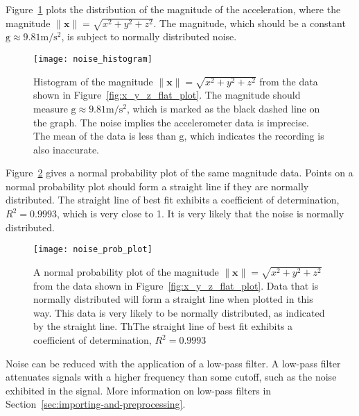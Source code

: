       
      Figure~\ref{fig:noise_histogram} plots the distribution of the magnitude of the acceleration, where the magnitude $\|\mathbf{x}\| = \sqrt{x^2+y^2+z^2}$. The magnitude, which should be a constant $\mathrm{g} \approx 9.81 \si{\meter\per\square\second}$, is subject to normally distributed noise.
      
      \begin{figure}
        \centering
        \texttt{[image: noise\_histogram]}
        \caption{Histogram of the magnitude $\|\mathbf{x}\| = \sqrt{x^2+y^2+z^2}$ from the data shown in Figure~\ref{fig:x_y_z_flat_plot}. The magnitude should measure $ \mathrm{g} \approx 9.81\si{\metre\per\square\second}$, which is marked as the black dashed line on the graph. The noise implies the accelerometer data is imprecise. The mean of the data is less than $\mathrm{g}$, which indicates the recording is also inaccurate.}
        \label{fig:noise_histogram}
      \end{figure}
      
      Figure~\ref{fig:noise_prob_plot} gives a normal probability plot of the same magnitude data. Points on a normal probability plot should form a straight line if they are normally distributed. The straight line of best fit exhibits a coefficient of determination, $R^2 = 0.9993$, which is very close to 1. It is very likely that the noise is normally distributed.
      
      \begin{figure}
        \centering
        \texttt{[image: noise\_prob\_plot]}
        \caption{A normal probability plot of the magnitude $\|\mathbf{x}\| = \sqrt{x^2+y^2+z^2}$  from the data shown in Figure~\ref{fig:x_y_z_flat_plot}. Data that is normally distributed will form a straight line when plotted in this way. This data is very likely to be normally distributed, as indicated by the straight line. ThThe straight line of best fit exhibits a coefficient of determination, $R^2 = 0.9993$}
        \label{fig:noise_prob_plot}
      \end{figure}
      
      
      Noise can be reduced with the application of a low-pass filter. A low-pass filter attenuates signals with a higher frequency than some cutoff, such as the noise exhibited in the signal. More information on low-pass filters in Section~\ref{sec:importing-and-preprocessing}.
      
